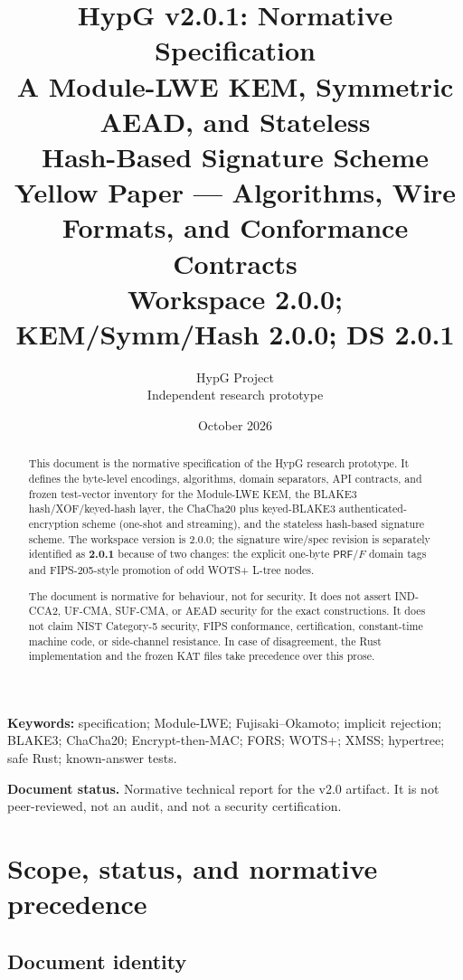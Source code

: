 \documentclass[11pt,a4paper]{article}
\title{\textbf{HypG v2.0.1: Normative Specification}\\[0.4ex]
\large A Module-LWE KEM, Symmetric AEAD, and Stateless\\
Hash-Based Signature Scheme\\[0.3ex]
\normalsize Yellow Paper --- Algorithms, Wire Formats, and Conformance Contracts\\[0.2ex]
\small Workspace 2.0.0; KEM/Symm/Hash 2.0.0; DS 2.0.1}
\author{HypG Project\\
\small Independent research prototype}
\date{October 2026}
\theoremstyle{plain}
\theoremstyle{definition}
\theoremstyle{remark}
\newcommand{\PRF}{\mathsf{PRF}}
\begin{document}
\maketitle

\begin{abstract}
This document is the normative specification of the HypG research
prototype.  It defines the byte-level encodings, algorithms, domain
separators, API contracts, and frozen test-vector inventory for the
Module-LWE KEM, the BLAKE3 hash/XOF/keyed-hash layer, the
ChaCha20 plus keyed-BLAKE3 authenticated-encryption scheme (one-shot
and streaming), and the stateless hash-based signature scheme.  The
workspace version is 2.0.0; the signature wire/spec revision is
separately identified as \textbf{2.0.1} because of two changes: the
explicit one-byte $\PRF$/$F$ domain tags and FIPS-205-style promotion of
odd WOTS+ L-tree nodes.

The document is normative for behaviour, not for security.  It does not
assert IND-CCA2, UF-CMA, SUF-CMA, or AEAD security for the exact
constructions.  It does not claim NIST Category-5 security, FIPS
conformance, certification, constant-time machine code, or side-channel
resistance.  In case of disagreement, the Rust implementation and the
frozen KAT files take precedence over this prose.
\end{abstract}

\noindent\textbf{Keywords:} specification; Module-LWE; Fujisaki--Okamoto;
implicit rejection; BLAKE3; ChaCha20; Encrypt-then-MAC; FORS; WOTS+;
XMSS; hypertree; safe Rust; known-answer tests.

\medskip
\noindent\textbf{Document status.} Normative technical report for the
v2.0 artifact.  It is not peer-reviewed, not an audit, and not a
security certification.

\tableofcontents
\newpage

\section{Scope, status, and normative precedence}
\label{sec:scope}

\subsection{Document identity}
\end{document}
